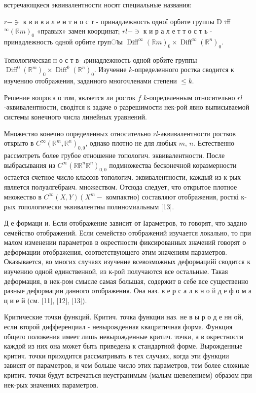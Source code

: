 \documentclass[10pt]{article}
\begin{document}
встречающкеся эквивалентности носят специальные названия:

$r-\ni$ к в и в а л е н т н о с т - принадлежность одної орбите группы $\mathrm{D}$ iff ${ }^{\infty}(\mathbb{R} m)_{0}$ «правых» замен коорцинат; $r l-\ni$ к и р а л е т т о с т ь - принадлежность одной орбите групाы $\operatorname{Diff}^{\infty}(\mathbb{R} m)_{0} \times \operatorname{Diff}^{\infty}\left(\mathbb{R}^{n}\right)_{0}$.

Топологическая н о с т в- ıринадлежность одной орбите группы $\operatorname{Diff}^{0}\left(\mathbb{R}^{m}\right)_{0} \times \operatorname{Diff}^{0}\left(\mathbb{R}^{n}\right)_{0}$. Изучение $k$-определенного ростка сводится к изучению отображения, заданного многочленами степени $\leqslant k$.

Решение вопроса о том, является ли росток $f$ $k$-определенным относительно $r l$-әквивалентности, сводітся к задаче о разрешимости нек-рой явно выписываемой системы конечного числа линейных уравнений.

Множество конечно определенных относительно $r l$-әквивалентности ростков открыто в $C^{\infty}\left(\mathbb{R}^{m}, \mathbb{R}^{n}\right)_{0,0}$, однако плотно не для любых $m$, $n$. Естественно рассмотреть более грубое отношение топологич. эквивалентности. После выбрасывания из $C^{\infty}\left(\mathbb{R} \mathbb{R}^{n} \mathbb{R}^{n}\right)_{0,0}$ подмножества бесконечной коразмерности остается счетное число классов топологич. эквивалентности, каждый из к-рых является полуалгебраич. множеством. Отсюда следует, что открытое плотное множество в $C^{\infty}(X, Y)\left(X^{m}-\right.$ компактно) составляют отображения, росткі к-рых топологически эквивалентны полиномиальным [13].

Д е формаци и. Если отображение зависит от Іараметров, то говорят, что задано семейство отображений. Если семейство отображений изучается локально, то при малом изменении параметров в окрестности фиксированных значений говорят о деформации отображения, соответствующего әтим значениям параметров. Оказывается, во многих случаях изучение всевозможных деформацийі сводится к изучению одной единственной, из к-рой получаются все остальные. Такая деформация, в нек-ром смысле самая большая, содержит в себе все существенно разные деформации данного отображения. Она наз. в е р с а л в н о й д е ф о м а ц и е й (см. [11], [12], [13]).

Критические точки функций. Критич. точка функции наз. не в ы р о д е нн ой, если второй дифференциал - невырожденная квацратичная форма. Функция общего положения имеет лишь невырожденные критич. точки, а в окрестности каждой из них она может быть приведена к стандартной форме. Вырожденные критич. точки приходится рассматривать в тех случаях, когда эти функции зависят от параметров, и чем больше число этих параметров, тем более сложные критич. точки будут встречаться неустранимым (малым шевелением) образом при нек-рых значениях параметров.
\end{document}
